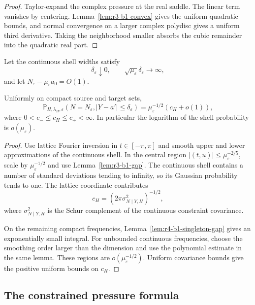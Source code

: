 \begin{proof}
Taylor-expand the complex pressure at the real saddle.  The linear term
vanishes by centering.  Lemma~\ref{lem:r3-b1-convex} gives the uniform
quadratic bounds, and normal convergence on a larger complex polydisc gives a
uniform third derivative.  Taking the neighborhood smaller absorbs the cubic
remainder into the quadratic real part.
\end{proof}

Let the continuous shell widths satisfy
\[
 \delta_\varepsilon\downarrow0,
 \qquad
 \sqrt{\mu_\varepsilon}\delta_\varepsilon\to\infty,
\]
and let \(N_\varepsilon-\mu_\varepsilon a_0=O(1)\).

\begin{theorem}
\label{thm:r3-b1-coefficient}
Uniformly on compact source and target sets,
\[
 \mathbb P_{H,\lambda_H,\varepsilon}
 \left(N=N_\varepsilon,
 |Y-a'|\le\delta_\varepsilon\right)
 =\mu_\varepsilon^{-1/2}(c_H+o(1)),
\]
where \(0<c_-\le c_H\le c_+<\infty\).  In particular the logarithm of the
shell probability is \(o(\mu_\varepsilon)\).
\end{theorem}

\begin{proof}
Use lattice Fourier inversion in \(t\in[-\pi,\pi]\) and smooth upper and lower
approximations of the continuous shell.  In the central region
\(|(t,u)|\le\mu_\varepsilon^{-2/5}\), scale by
\(\mu_\varepsilon^{-1/2}\) and use
Lemma~\ref{lem:r3-b1-gap}.  The continuous shell contains a number of standard
deviations tending to infinity, so its Gaussian probability tends to one.
The lattice coordinate contributes
\[
 c_H=(2\pi\sigma_{N\mid Y,H}^2)^{-1/2},
\]
where \(\sigma_{N\mid Y,H}^2\) is the Schur complement of the continuous
constraint covariance.

On the remaining compact frequencies,
Lemma~\ref{lem:r4-b1-singleton-gap} gives an exponentially small integral.
For unbounded continuous frequencies, choose the smoothing order larger than
the dimension and use the polynomial estimate in the same lemma.  These
regions are \(o(\mu_\varepsilon^{-1/2})\).  Uniform covariance bounds give
the positive uniform bounds on \(c_H\).
\end{proof}

\subsection{The constrained pressure formula}

